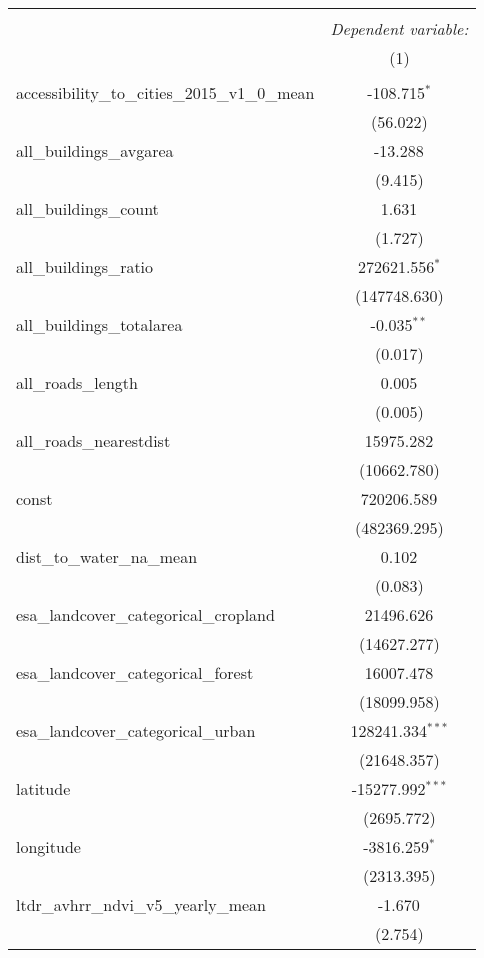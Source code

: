 \begin{table}[!htbp] \centering
\begin{tabular}{@{\extracolsep{5pt}}lc}
\\[-1.8ex]\hline
\hline \\[-1.8ex]
& \multicolumn{1}{c}{\textit{Dependent variable:}} \
\cr \cline{1-2}
\\[-1.8ex] & (1) \\
\hline \\[-1.8ex]
 accessibility_to_cities_2015_v1_0_mean & -108.715$^{*}$ \\
  & (56.022) \\
 all_buildings_avgarea & -13.288$^{}$ \\
  & (9.415) \\
 all_buildings_count & 1.631$^{}$ \\
  & (1.727) \\
 all_buildings_ratio & 272621.556$^{*}$ \\
  & (147748.630) \\
 all_buildings_totalarea & -0.035$^{**}$ \\
  & (0.017) \\
 all_roads_length & 0.005$^{}$ \\
  & (0.005) \\
 all_roads_nearestdist & 15975.282$^{}$ \\
  & (10662.780) \\
 const & 720206.589$^{}$ \\
  & (482369.295) \\
 dist_to_water_na_mean & 0.102$^{}$ \\
  & (0.083) \\
 esa_landcover_categorical_cropland & 21496.626$^{}$ \\
  & (14627.277) \\
 esa_landcover_categorical_forest & 16007.478$^{}$ \\
  & (18099.958) \\
 esa_landcover_categorical_urban & 128241.334$^{***}$ \\
  & (21648.357) \\
 latitude & -15277.992$^{***}$ \\
  & (2695.772) \\
 longitude & -3816.259$^{*}$ \\
  & (2313.395) \\
 ltdr_avhrr_ndvi_v5_yearly_mean & -1.670$^{}$ \\
  & (2.754) \\

\end{tabular}
\end{table}
